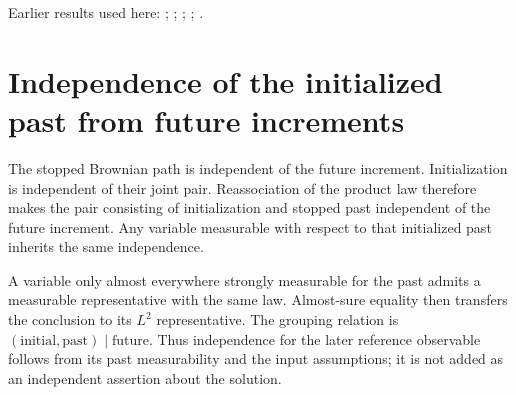\documentclass[11pt,a4paper]{article}
\begin{document}
Earlier results used here: \cite[Section~3.24.14]{LangevinLean2026ULASC}; \cite[Section~3.24.15]{LangevinLean2026ULASC}; \cite[Section~3.24.21]{LangevinLean2026ULASC}; \cite[Section~3.24.8]{LangevinLean2026ULASC}; \cite[Section~3.25.1]{LangevinLean2026ULASC}.

\section{\texorpdfstring{Independence of the initialized past from future increments}{Independence of the initialized past from future increments}}


The stopped Brownian path is independent of the future increment. Initialization is independent of their joint pair. Reassociation of the product law therefore makes the pair consisting of initialization and stopped past independent of the future increment. Any variable measurable with respect to that initialized past inherits the same independence.



A variable only almost everywhere strongly measurable for the past admits a measurable representative with the same law. Almost-sure equality then transfers the conclusion to its \(L^2\) representative. The grouping relation is \((\text{initial},\text{past})\mid\text{future}\). Thus independence for the later reference observable follows from its past measurability and the input assumptions; it is not added as an independent assertion about the solution.
\end{document}
